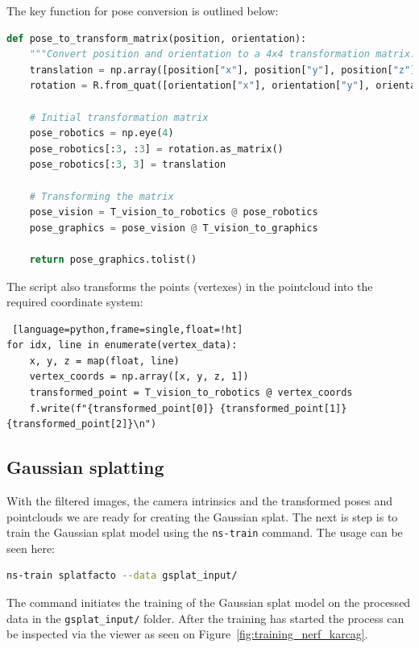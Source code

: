 The key function for pose conversion is outlined below:
\FloatBarrier \begin{lstlisting}[language=python,frame=single,float=!ht]
def pose_to_transform_matrix(position, orientation):
    """Convert position and orientation to a 4x4 transformation matrix."""
    translation = np.array([position["x"], position["y"], position["z"]])
    rotation = R.from_quat([orientation["x"], orientation["y"], orientation["z"], orientation["w"]])
    
    # Initial transformation matrix
    pose_robotics = np.eye(4)
    pose_robotics[:3, :3] = rotation.as_matrix()
    pose_robotics[:3, 3] = translation

    # Transforming the matrix
    pose_vision = T_vision_to_robotics @ pose_robotics
    pose_graphics = pose_vision @ T_vision_to_graphics

    return pose_graphics.tolist()
\end{lstlisting}

The script also transforms the points (vertexes) in the pointcloud into the required coordinate system:
\FloatBarrier \begin{lstlisting} [language=python,frame=single,float=!ht]
for idx, line in enumerate(vertex_data):
    x, y, z = map(float, line)
    vertex_coords = np.array([x, y, z, 1])
    transformed_point = T_vision_to_robotics @ vertex_coords
    f.write(f"{transformed_point[0]} {transformed_point[1]} {transformed_point[2]}\n")
\end{lstlisting}

\subsection{Gaussian splatting}

With the filtered images, the camera intrinsics and the transformed poses and pointclouds we are ready for creating the Gaussian splat. The next is step is to train the Gaussian splat model using the \verb|ns-train| command. The usage can be seen here:
\FloatBarrier
\begin{lstlisting}[language=bash,frame=single,float=!ht]
ns-train splatfacto --data gsplat_input/
\end{lstlisting}
\FloatBarrier

The command initiates the training of the Gaussian splat model on the processed data in the \verb|gsplat_input/| folder. After the training has started the process can be inspected via the viewer as seen on Figure~\ref{fig:training_nerf_karcag}.

